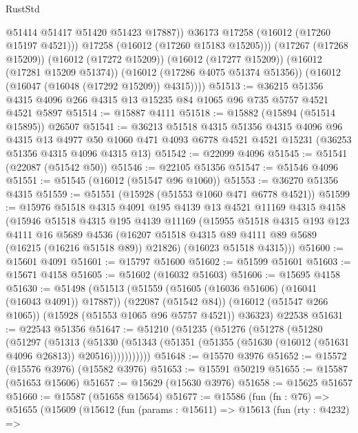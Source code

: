 \begin{lexlean}{RustStd}
\begin{coremodule}
                @51414
                @51417
                @51420
                @51423
                @17887))
            @36173
            @17258
            (@16012 (@17260 @15197 @4521)))
          @17258
          (@16012 (@17260 @15183 @15205)))
        (@17267 (@17268 @15209))
        (@16012 (@17272 @15209))
        (@16012 (@17277 @15209))
        (@16012 (@17281 @15209 @51374))
        (@16012 (@17286 @4075 @51374 @51356))
        (@16012 (@16047 (@16048 (@17292 @15209)) @4315))))
@51513 := @36215 @51356 @4315 @4096 @266 @4315 @13 @15235 @84 @1065 @96 @735 @5757 @4521 @4521 @5897
@51514 := @15887 @4111
@51518 := @15882 (@15894 (@51514 @15895)) @26507
@51541 := @36213
    @51518
    @4315
    @51356
    @4315
    @4096
    @96
    @4315
    @13
    @4977
    @50
    @1060
    @471
    @4093
    @6778
    @4521
    @4521
    @15231
    (@36253 @51356 @4315 @4096 @4315 @13)
@51542 := @22099 @4096
@51545 := @51541 (@22087 (@51542 @50))
@51546 := @22105 @51356
@51547 := @51546 @4096
@51551 := @51545 (@16012 (@51547 @96 @1060))
@51553 := @36270 @51356 @4315
@51559 := @51551 (@15928 (@51553 @1060 @471 @6778 @4521))
@51599 := @15976
    @51518
    @4315
    @4091
    @195
    @4139
    @13
    @4521
    @11169
    @4315
    @4158
    (@15946
      @51518
      @4315
      @195
      @4139
      @11169
      (@15955
        @51518
        @4315
        @193
        @123
        @4111
        @16
        @5689
        @4536
        (@16207 @51518 @4315 @89 @4111 @89 @5689 (@16215 (@16216 @51518 @89)) @21826)
        (@16023 @51518 @4315)))
@51600 := @15601 @4091
@51601 := @15797 @51600
@51602 := @51599 @51601
@51603 := @15671 @4158
@51605 := @51602 (@16032 @51603)
@51606 := @15695 @4158
@51630 := @51498
    (@51513
      (@51559 (@51605 (@16036 @51606) (@16041 (@16043 @4091)) @17887))
      (@22087 (@51542 @84))
      (@16012 (@51547 @266 @1065))
      (@15928 (@51553 @1065 @96 @5757 @4521))
      @36323)
    @22538
@51631 := @22543 @51356
@51647 := @51210
    (@51235
      (@51276
        (@51278
          (@51280
            (@51297
              (@51313
                (@51330
                  (@51343 (@51351 (@51355 (@51630 (@16012 (@51631 @4096 @26813)) @20516)))))))))))
@51648 := @15570 @3976
@51652 := @15572 (@15576 @3976) (@15582 @3976)
@51653 := @15591 @50219
@51655 := @15587 (@51653 @15606)
@51657 := @15629 (@15630 @3976)
@51658 := @15625 @51657
@51660 := @15587 (@51658 @15654)
@51677 := @15586
    (fun (fn : @76) =>
    @51655
      (@15609
        (@15612
          (fun (params : @15611) =>
          @15613
            (fun (rty : @4232) =>

\end{coremodule}
\end{lexlean}
